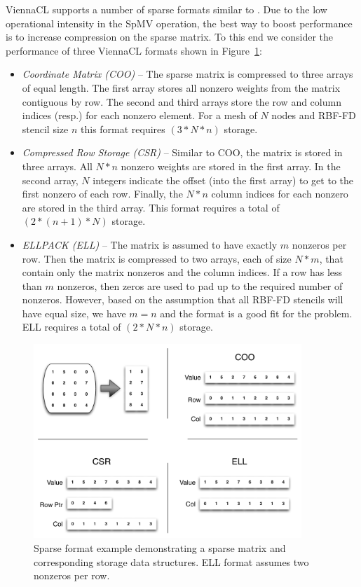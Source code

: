 \documentclass{report}
\begin{document}
ViennaCL supports a number of sparse formats similar to \cite{Bell2009,Cusp2012}. Due to the low operational intensity in the SpMV operation, the best way to boost performance is to increase compression on the sparse matrix. To this end we consider the performance of three ViennaCL formats shown in Figure~\ref{fig:sparse_format}: 
\begin{itemize} 
\item \emph{Coordinate Matrix (COO)} -- The sparse matrix is compressed to three arrays of equal length. The first array stores all nonzero weights from the matrix contiguous by row. The second and third arrays store the row and column indices (resp.) for each nonzero element. For a mesh of $N$ nodes and RBF-FD stencil size $n$ this format requires $(3*N*n)$ storage.  %
\item \emph{Compressed Row Storage (CSR)} -- Similar to COO, the matrix is stored in three arrays. All $N*n$ nonzero weights are stored in the first array. In the second array, $N$ integers indicate the offset (into the first array) to get to the first nonzero of each row. Finally, the $N*n$ column indices for each nonzero are stored in the third array. This format requires a total of $(2*(n+1)*N)$ storage.
\item \emph{ELLPACK (ELL)} -- The matrix is assumed to have exactly $m$ nonzeros per row. Then the matrix is compressed to two arrays, each of size $N*m$, that contain only the matrix nonzeros and the column indices. If a row has less than $m$ nonzeros, then zeros are used to pad up to the required number of nonzeros. However, based on the assumption that all RBF-FD stencils will have equal size, we have $m=n$ and the format is a good fit for the problem. ELL requires a total of $(2*N*n)$ storage. 
\end{itemize}


\begin{figure}
\centering
\includegraphics[width=0.9\textwidth]{gpu_content/omnigraffle/SparseStorage.pdf}
\caption{Sparse format example demonstrating a sparse matrix and corresponding storage data structures. ELL format assumes two nonzeros per row. }
\label{fig:sparse_format}
\end{figure}
\end{document}
